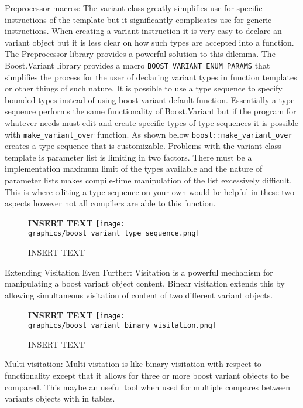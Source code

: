 \documentclass[letterpaper, 12pt]{article}
\begin{document}
Preprocessor macros:
The variant class greatly simplifies use for specific instructions of the template but it
significantly complicates use for generic instructions. When creating a variant instruction
it is very easy to declare an variant object but it is less clear on how such types are
accepted into a function. The Preprocessor library provides a powerful solution to this dilemma.
The Boost.Variant library provides a macro \lstinline|BOOST_VARIANT_ENUM_PARAMS| that
simplifies the process for the user of declaring variant types in function templates or
other things of such nature. It is possible to use a type sequence to specify bounded types
instead of using boost variant default function. Essentially a type sequence performs the
same functionality of Boost.Variant but if the program for whatever needs must edit and
create specific types of type sequences it is possible with \lstinline|make_variant_over|
function. As shown below \lstinline|boost::make_variant_over| creates a type sequence that
is customizable. Problems with the variant class template is parameter list is limiting in
two factors. There must be a implementation maximum limit of the types available and the
nature of parameter lists makes compile-time manipulation of the list excessively difficult.
This is where editing a type sequence on your own would be helpful in these two aspects
however not all compilers are able to this function.
\par\vspace{\baselineskip}

\begin{figure}
  \centering
  \textbf{INSERT TEXT}
  \texttt{[image: graphics/boost\_variant\_type\_sequence.png]}
  \caption{INSERT TEXT}
\end{figure}

Extending Visitation Even Further:
Visitation is a powerful mechanism for manipulating a boost variant object content. Binear visitation
extends this by allowing simultaneous visitation of content of two different variant objects.
\par\vspace{\baselineskip}

\begin{figure}
  \centering
  \textbf{INSERT TEXT}
  \texttt{[image: graphics/boost\_variant\_binary\_visitation.png]}
  \caption{INSERT TEXT}
\end{figure}

Multi visitation:
Multi vistation is like binary visitation with respect to functionality except that it allows for
three or more boost variant objects to be compared. This maybe an useful tool when used for
multiple compares between variants objects with in tables.
\end{document}
